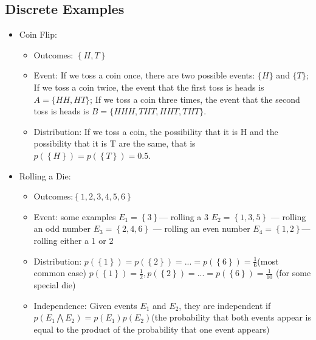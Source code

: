 \subsection{Discrete Examples}
\begin{itemize}
\item Coin Flip: 
        \begin{itemize}
        \item Outcomes: $\left\{ H, T\right\}$
        \item Event:  If we toss a coin once, there are two possible events: $\{H\}$ and $\{T\}$; If we toss a coin twice, the event that the first toss is heads is $A = \{HH,HT\}$;  If we toss a coin three times, the event that the second toss is heads is $B = \{HHH, THT,HHT, THT\}$.
        \item Distribution: If we toss a coin, the possibility that it is H and the possibility that it is T are the same, that is $p(\left\{H  \right\})=p(\left\{ T \right\})=0.5$.%
        \end{itemize}
\item Rolling a Die:
        \begin{itemize}
        \item Outcomes:$\left\{ 1, 2, 3, 4, 5, 6\right\}$
        \item Event: some examples\newline
        		$E_{1}=\left\{ 3\right\}$--- rolling a 3\newline
                 $E_{2}=\left\{ 1, 3, 5\right\}$ --- rolling an odd number\newline
                 $E_{3}=\left\{ 2, 4, 6\right\}$ --- rolling an even number \newline
                 $E_{4}=\left\{ 1, 2\right\} $--- rolling either a 1 or 2
        \item Distribution: $p(\left\{1 \right\})=p(\left\{ 2 \right\})=...=p(\left\{ 6 \right\})= \frac{1}{6}$(most common case)\newline
        $p(\left\{ 1\right\})=\frac{1}{2}, p(\left\{ 2 \right\})=...=p(\left\{ 6 \right\})=\frac{1}{10}$ (for some special die)
        \item Independence: Given events $E_{1}$ and $E_{2}$, they are independent if \newline
        $p(E_{1} \bigwedge E_{2})=p(E_{1})p(E_{2})$(the probability that both events appear is equal to the product of the probability that one event appears)\newline

\end{itemize}
\end{itemize}
